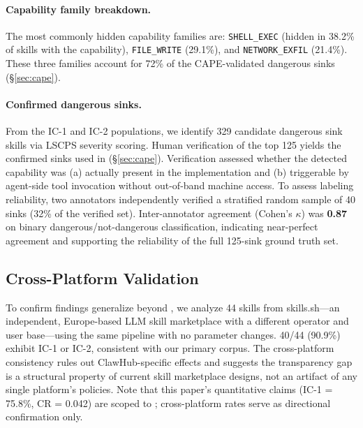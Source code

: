 \paragraph{Capability family breakdown.}
The most commonly hidden capability families are:
\texttt{SHELL\_EXEC} (hidden in 38.2\% of skills with the capability),
\texttt{FILE\_WRITE} (29.1\%), and \texttt{NETWORK\_EXFIL} (21.4\%).
These three families account for 72\% of the CAPE-validated dangerous sinks (\S\ref{sec:cape}).

\paragraph{Confirmed dangerous sinks.}
From the IC-1 and IC-2 populations, we identify 329 candidate
dangerous sink skills via LSCPS severity scoring.
Human verification of the top 125 yields the \NpairsTotal confirmed
sinks used in \cape (\S\ref{sec:cape}).
Verification assessed whether the detected capability was
(a) actually present in the implementation and
(b) triggerable by agent-side tool invocation without out-of-band
machine access.
To assess labeling reliability, two annotators independently verified
a stratified random sample of 40 sinks (32\% of the verified set).
Inter-annotator agreement (Cohen's $\kappa$) was \textbf{0.87} on
binary dangerous/not-dangerous classification,
indicating near-perfect agreement and supporting the reliability
of the full 125-sink ground truth set.

\subsection{Cross-Platform Validation}

To confirm findings generalize beyond \clawhub,
we analyze 44 skills from skills.sh---an independent, Europe-based
LLM skill marketplace with a different operator and user base---using
the same \lscps pipeline with no parameter changes.
40/44 (90.9\%) exhibit IC-1 or IC-2,
consistent with our primary corpus.
The cross-platform consistency rules out ClawHub-specific effects
and suggests the transparency gap is a structural property of
current skill marketplace designs, not an artifact of any single platform's policies.
Note that this paper's quantitative claims (IC-1 = 75.8\%, CR = 0.042)
are scoped to \clawhub; cross-platform rates serve as directional confirmation only.
